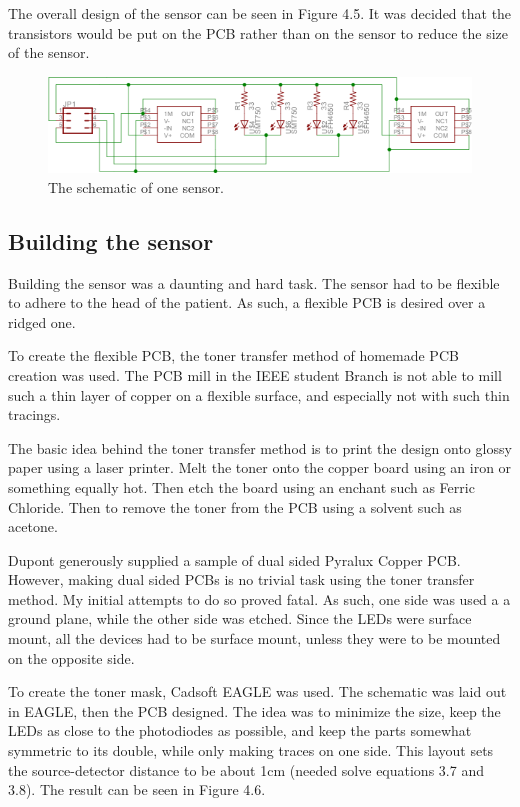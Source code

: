 The overall design of the sensor can be seen in Figure 4.5. It was decided that the transistors would be put on the PCB rather than on the sensor to reduce the size of the sensor.

\begin{figure}[htp]
\centering
\includegraphics[width=6in]{sensor.png}
\caption[Sensor schematic]{The schematic of one sensor.}
\end{figure}

\subsection {Building the sensor}

Building the sensor was a daunting and hard task. The sensor had to be flexible to adhere to the head of the patient. As such, a flexible PCB is desired over a ridged one. 

To create the flexible PCB, the toner transfer method of homemade PCB creation was used. The PCB mill in the IEEE student Branch is not able to mill such a thin layer of copper on a flexible surface, and especially not with such thin tracings. 

The basic idea behind the toner transfer method is to print the design onto glossy paper using a laser printer. Melt the toner onto the copper board using an iron or something equally hot. Then etch the board using an enchant such as Ferric Chloride. Then to remove the toner from the PCB using a solvent such as acetone.

Dupont generously supplied a sample of dual sided Pyralux Copper PCB. However, making dual sided PCBs is no trivial task using the toner transfer method. My initial attempts to do so proved fatal. As such, one side was used a a ground plane, while the other side was etched. Since the LEDs were surface mount, all the devices had to be surface mount, unless they were to be mounted on the opposite side. 

To create the toner mask, Cadsoft EAGLE was used. The schematic was laid out in EAGLE, then the PCB designed. The idea was to minimize the size, keep the LEDs as close to the photodiodes as possible, and keep the parts somewhat symmetric to its double, while only making traces on one side. This layout sets the source-detector distance to be about 1cm (needed solve equations 3.7 and 3.8). The result can be seen in Figure 4.6.

